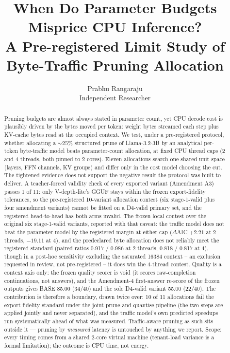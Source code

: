 \documentclass[10pt,letterpaper,twocolumn]{article}
\title{When Do Parameter Budgets Misprice CPU Inference?\\ A Pre-registered Limit Study of Byte-Traffic Pruning Allocation}
\author{Prabhu Rangaraju\\ Independent Researcher}
\date{}
\begin{document}
\maketitle


\begin{abstract}
Pruning budgets are almost always stated in
parameter count, yet CPU decode cost is plausibly driven by the bytes
moved per token: weight bytes streamed each step plus KV-cache bytes
read at the occupied context. We test, under a pre-registered
protocol, whether allocating a $\sim$25\% structured prune of
Llama-3.2-3B by an analytical per-token byte-traffic model beats
parameter-count allocation, at fixed CPU thread caps
(2 and 4 threads, both pinned to 2 cores). Eleven
allocations search one shared unit space (layers, FFN channels, KV
groups) and differ only in the cost model choosing the cut.
The tightened evidence does not support the negative
result the protocol was built to deliver. A teacher-forced validity check of
every exported variant (Amendment A3) passes 1 of 11:
only V-depth-lite's GGUF stays within the frozen export-fidelity
tolerances, so the pre-registered 10-variant allocation contest
(six stage-1-valid plus four amendment variants)
cannot be fitted on a D4-valid primary set, and the registered
head-to-head has both arms invalid. The frozen local contest over
the original six stage-1-valid variants, reported with that caveat:
the traffic model does not beat the parameter model by the registered margin at either cap ($\Delta$AIC $+2.21$ at 2 threads, $-19.11$ at 4), and
the predeclared byte allocation does not reliably meet the
registered standard (paired ratios 0.917 / 0.986 at 2 threads,
0.818 / 0.817 at 4), though in a post-hoc sensitivity excluding the saturated
16384 context -- an exclusion requested in review, not
pre-registered -- it does win the 4-thread contest. Quality is a
context axis only: the frozen quality scorer is void (it scores
raw-completion continuations, not answers), and the Amendment-4
first-answer re-score of the frozen outputs gives BASE 85.00
(34/40) and the sole D4-valid variant 55.00 (22/40). The contribution is
therefore a boundary, drawn twice over: 10 of 11 allocations
fail the export-fidelity standard under the joint
prune-and-quantise pipeline (the two steps are applied jointly
and never separated), and
the traffic model's own predicted speedups run systematically
ahead of what was measured. Traffic-aware pruning as
such sits outside it --- pruning by \emph{measured} latency is
untouched by anything we report. Scope: every timing comes from
a shared 2-core virtual machine (tenant-load variance is a
formal limitation); the outcome is CPU time, not energy.
\end{abstract}
\end{document}
